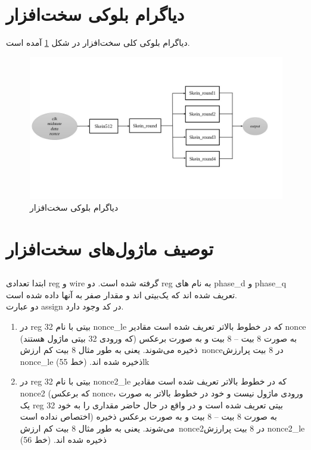 \section{دیاگرام بلوکی سخت‌افزار}
دیاگرام بلوکی کلی سخت‌افزار در شکل 
\ref{block_diagram}
آمده است. 

\begin{figure}
\includegraphics[width = \textwidth]{figs/DescriptionOfSystem/block_diagram.jpg}
\caption{دیاگرام بلوکی سخت‌افزار}
\label{block_diagram}
\end{figure}

\section{توصیف ماژول‌های سخت‌افزار}
\subsection{}
ابتدا تعدادی reg و wire گرفته شده است.
دو reg به نام های phase\_d و phase\_q تعریف شده اند که یک‌بیتی اند و مقدار صفر به آنها داده شده است.\\
دو عبارت assign در کد وجود دارد.

\begin{enumerate}
	\item در reg 32 بیتی با نام nonce\_le که در خطوط بالاتر تعریف شده است مقادیر nonce (که ورودی 32 بیتی ماژول هستند) به صورت 8 بیت – 8 بیت و به صورت برعکس ذخیره می‌شوند. یعنی به طور مثال 8 بیت کم ارزش\  nonceدر 8 بیت پرارزش nonce\_le ذخیره شده اند. (خط 55)lk\par

	\item در reg 32 بیتی با نام nonce2\_le که در خطوط بالاتر تعریف شده است مقادیر nonce2 (که برعکس nonce، ورودی ماژول نیست و خود در خطوط بالاتر به صورت یک reg 32 بیتی تعریف شده است و در واقع در حال حاضر مقداری را به خود اختصاص نداده است) به صورت 8 بیت – 8 بیت و به صورت برعکس ذخیره می‌شوند. یعنی به طور مثال 8 بیت کم ارزش\  nonce2در 8 بیت پرارزش nonce2\_le ذخیره شده اند. (خط 56)
\end{enumerate}

